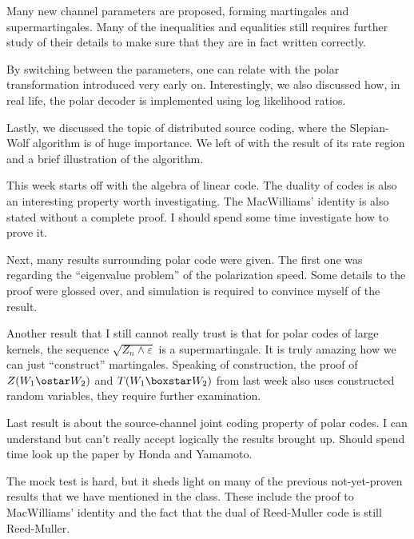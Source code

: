 \begin{summary}{5}
    Many new channel parameters are proposed, forming martingales and supermartingales. Many of the inequalities and equalities still requires further study of their details to make sure that they are in fact written correctly.
    
    By switching between the parameters, one can relate with the polar transformation introduced very early on. Interestingly, we also discussed how, in real life, the polar decoder is implemented using log likelihood ratios.

    Lastly, we discussed the topic of distributed source coding, where the Slepian-Wolf algorithm is of huge importance. We left of with the result of its rate region and a brief illustration of the algorithm.
\end{summary}

\begin{summary}{6}
    This week starts off with the algebra of linear code. The duality of codes is also an interesting property worth investigating. The MacWilliams' identity is also stated without a complete proof. I should spend some time investigate how to prove it.

    Next, many results surrounding polar code were given. The first one was regarding the ``eigenvalue problem'' of the polarization speed. Some details to the proof were glossed over, and simulation is required to convince myself of the result.

    Another result that I still cannot really trust is that for polar codes of large kernels, the sequence $\sqrt{Z_n\wedge\varepsilon}$ is a supermartingale. It is truly amazing how we can just ``construct'' martingales. Speaking of construction, the proof of $Z(W_1\ostar W_2)$ and $T(W_1\boxstar W_2)$ from last week also uses constructed random variables, they require further examination.

    Last result is about the source-channel joint coding property of polar codes. I can understand but can't really accept logically the results brought up. Should spend time look up the paper by Honda and Yamamoto.
\end{summary}

\begin{summary}{7}
    The mock test is hard, but it sheds light on many of the previous not-yet-proven results that we have mentioned in the class. These include the proof to MacWilliams' identity and the fact that the dual of Reed-Muller code is still Reed-Muller.
\end{summary}